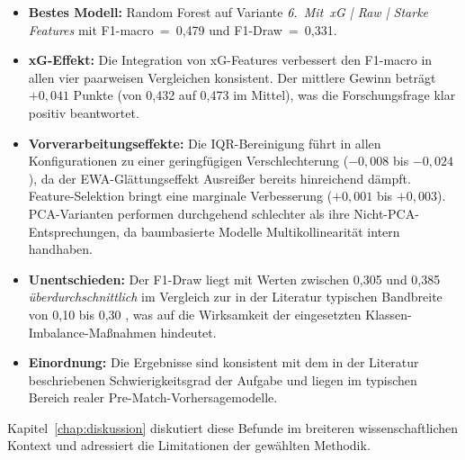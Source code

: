 \begin{itemize}
    \item \textbf{Bestes Modell:} Random Forest auf Variante \emph{6.~Mit~xG
          | Raw | Starke Features} mit F1-macro~=~0,479 und F1-Draw~=~0,331.

    \item \textbf{xG-Effekt:} Die Integration von xG-Features verbessert
          den F1-macro in allen vier paarweisen Vergleichen konsistent.
          Der mittlere Gewinn beträgt $+0{,}041$ Punkte (von 0,432 auf
          0,473 im Mittel), was die Forschungsfrage klar positiv beantwortet.

    \item \textbf{Vorverarbeitungseffekte:} Die IQR-Bereinigung führt
          in allen Konfigurationen zu einer geringfügigen Verschlechterung
          ($-0{,}008$ bis $-0{,}024$), da der EWA-Glättungseffekt Ausreißer
          bereits hinreichend dämpft. Feature-Selektion bringt eine marginale
          Verbesserung ($+0{,}001$ bis $+0{,}003$). PCA-Varianten performen
          durchgehend schlechter als ihre Nicht-PCA-Entsprechungen, da
          baumbasierte Modelle Multikollinearität intern handhaben.

    \item \textbf{Unentschieden:} Der F1-Draw liegt mit Werten zwischen
          0,305 und 0,385 \emph{überdurchschnittlich} im Vergleich zur in
          der Literatur typischen Bandbreite von 0,10 bis 0,30
          \cite{BunkerThabtah2019,HubacekSourekZelezny2019}, was auf
          die Wirksamkeit der eingesetzten Klassen-Imbalance-Maßnahmen
          hindeutet.

    \item \textbf{Einordnung:} Die Ergebnisse sind konsistent mit dem in
          der Literatur beschriebenen Schwierigkeitsgrad der Aufgabe
          \cite{BunkerThabtah2019,DobsonGoddard2011} und liegen im
          typischen Bereich realer Pre-Match-Vorhersagemodelle.
\end{itemize}

Kapitel~\ref{chap:diskussion} diskutiert diese Befunde im breiteren
wissenschaftlichen Kontext und adressiert die Limitationen der gewählten
Methodik.